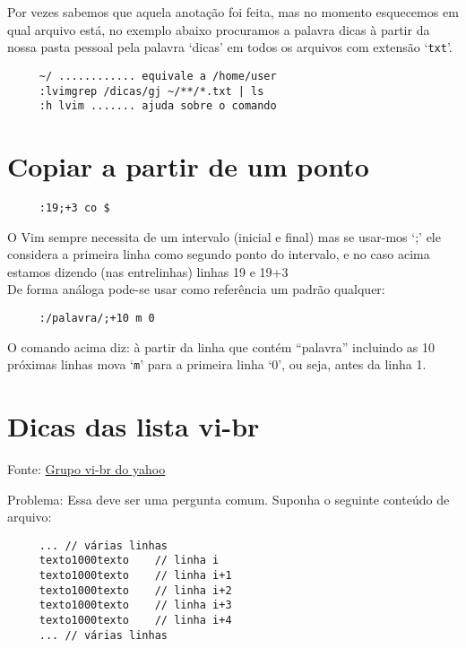 Por vezes sabemos que aquela anotação foi feita, mas no momento esquecemos em qual
arquivo está, no exemplo abaixo procuramos a palavra dicas à partir da nossa pasta pessoal
pela palavra `dicas' em todos os arquivos com extensão `{\tt txt}'.

\begin{verbatim}
     ~/ ............ equivale a /home/user
     :lvimgrep /dicas/gj ~/**/*.txt | ls
     :h lvim ....... ajuda sobre o comando
\end{verbatim}



\section{Copiar a partir de um ponto}

\begin{verbatim}
     :19;+3 co $
\end{verbatim}

O Vim sempre necessita de um intervalo (inicial e final) mas se usar-mos
`;' ele considera a primeira linha como segundo ponto do
intervalo, e no caso acima estamos dizendo (nas entrelinhas) linhas
19 e 19+3     \\


De forma análoga pode-se usar como referência um padrão qualquer:

\begin{verbatim}
     :/palavra/;+10 m 0
\end{verbatim}

O comando acima diz: à partir da linha que contém ``palavra'' incluindo as 10 próximas linhas
mova `{\tt m}' para a primeira linha `0', ou seja, antes da linha 1.

\section{Dicas das lista vi-br}

Fonte: \href{http://groups.yahoo.com/group/vi-br/message/853}{Grupo vi-br do yahoo}

Problema:
Essa deve ser uma pergunta comum.
Suponha o seguinte conteúdo de arquivo:

\begin{verbatim}
     ... // várias linhas
     texto1000texto    // linha i
     texto1000texto    // linha i+1
     texto1000texto    // linha i+2
     texto1000texto    // linha i+3
     texto1000texto    // linha i+4
     ... // várias linhas
\end{verbatim}

